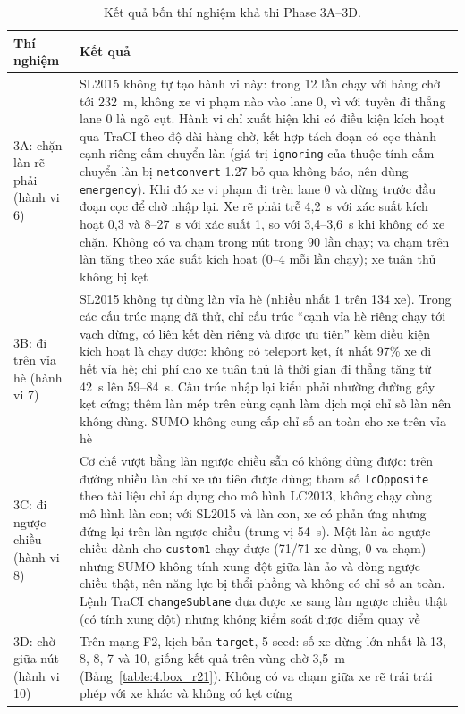\documentclass[../DoAn.tex]{subfiles}
\begin{document}
\begin{table}[H]
\centering
\small
\caption{Kết quả bốn thí nghiệm khả thi Phase 3A--3D.}
\label{table:4.phase3}
\begin{tabular}{|p{2.4cm}|p{11.6cm}|}
\hline
\textbf{Thí nghiệm} & \textbf{Kết quả} \\ \hline
3A: chặn làn rẽ phải (hành vi 6) & SL2015 không tự tạo hành vi này: trong 12 lần chạy với hàng chờ tới 232~m, không xe vi phạm nào vào lane 0, vì với tuyến đi thẳng lane 0 là ngõ cụt. Hành vi chỉ xuất hiện khi có điều kiện kích hoạt qua TraCI theo độ dài hàng chờ, kết hợp tách đoạn có cọc thành cạnh riêng cấm chuyển làn (giá trị \texttt{ignoring} của thuộc tính cấm chuyển làn bị \texttt{netconvert} 1.27 bỏ qua không báo, nên dùng \texttt{emergency}). Khi đó xe vi phạm đi trên lane 0 và dừng trước đầu đoạn cọc để chờ nhập lại. Xe rẽ phải trễ 4,2~s với xác suất kích hoạt 0,3 và 8--27~s với xác suất 1, so với 3,4--3,6~s khi không có xe chặn. Không có va chạm trong nút trong 90 lần chạy; va chạm trên làn tăng theo xác suất kích hoạt (0--4 mỗi lần chạy); xe tuân thủ không bị kẹt \\ \hline
3B: đi trên vỉa hè (hành vi 7) & SL2015 không tự dùng làn vỉa hè (nhiều nhất 1 trên 134 xe). Trong các cấu trúc mạng đã thử, chỉ cấu trúc ``cạnh vỉa hè riêng chạy tới vạch dừng, có liên kết đèn riêng và được ưu tiên'' kèm điều kiện kích hoạt là chạy được: không có teleport kẹt, ít nhất 97\% xe đi hết vỉa hè; chi phí cho xe tuân thủ là thời gian đi thẳng tăng từ 42~s lên 59--84~s. Cấu trúc nhập lại kiểu phải nhường đường gây kẹt cứng; thêm làn mép trên cùng cạnh làm dịch mọi chỉ số làn nên không dùng. SUMO không cung cấp chỉ số an toàn cho xe trên vỉa hè \\ \hline
3C: đi ngược chiều (hành vi 8) & Cơ chế vượt bằng làn ngược chiều sẵn có không dùng được: trên đường nhiều làn chỉ xe ưu tiên được dùng; tham số \texttt{lcOpposite} theo tài liệu chỉ áp dụng cho mô hình LC2013, không chạy cùng mô hình làn con; với SL2015 và làn con, xe có phản ứng nhưng đứng lại trên làn ngược chiều (trung vị 54~s). Một làn ảo ngược chiều dành cho \texttt{custom1} chạy được (71/71 xe dùng, 0 va chạm) nhưng SUMO không tính xung đột giữa làn ảo và dòng ngược chiều thật, nên năng lực bị thổi phồng và không có chỉ số an toàn. Lệnh TraCI \texttt{changeSublane} đưa được xe sang làn ngược chiều thật (có tính xung đột) nhưng không kiểm soát được điểm quay về \\ \hline
3D: chờ giữa nút (hành vi 10) & Trên mạng F2, kịch bản \texttt{target}, 5 seed: số xe dừng lớn nhất là 13, 8, 8, 7 và 10, giống kết quả trên vùng chờ 3,5~m (Bảng~\ref{table:4.box_r21}). Không có va chạm giữa xe rẽ trái trái phép với xe khác và không có kẹt cứng \\ \hline
\end{tabular}
\end{table}
\end{document}
